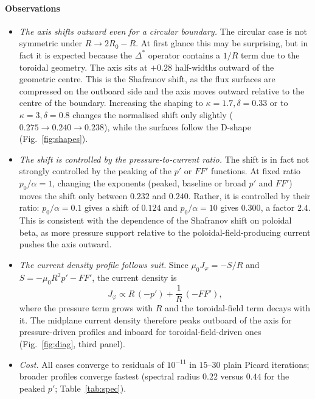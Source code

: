 \documentclass[11pt,a4paper]{article}
\begin{document}
\paragraph{Observations}
\begin{itemize}[nosep]
\item \emph{The axis shifts outward even for a circular boundary.} The circular case is not symmetric under $R\to2R_0-R$. At first glance this may be surprising, but in fact it is expected because the $\Delta^*$ operator contains a $1/R$ term due to the toroidal geometry. The axis sits at $+0.28$ half-widths outward of the geometric centre. This is the Shafranov shift, as the flux surfaces are compressed on the outboard side and the axis moves outward relative to the centre of the boundary. Increasing the shaping to $\kappa=1.7,\delta=0.33$ or to $\kappa=3,\delta=0.8$ changes the normalised shift only slightly ($0.275\to0.240\to0.238$), while the surfaces follow the D-shape (Fig.~\ref{fig:shapes}).
\item \emph{The shift is controlled by the pressure-to-current ratio.} The shift is in fact not strongly controlled by the peaking of the $p'$ or $FF'$ functions. At fixed ratio $p_0/\alpha=1$, changing the exponents (peaked, baseline or broad $p'$ and $FF'$) moves the shift only between $0.232$ and $0.240$. Rather, it is controlled by their ratio: $p_0/\alpha=0.1$ gives a shift of $0.124$ and $p_0/\alpha=10$ gives $0.300$, a factor $2.4$. This is consistent with the dependence of the Shafranov shift on poloidal beta, as more pressure support relative to the poloidal-field-producing current pushes the axis outward.
\item \emph{The current density profile follows suit.} Since $\mu_0J_\varphi=-S/R$ and $S=-\mu_0R^2p'-FF'$, the current density is
\begin{equation*}
J_\varphi\propto R\,(-p')+\frac{1}{R}\,(-FF'),
\end{equation*}
where the pressure term grows with $R$ and the toroidal-field term decays with it. The midplane current density therefore peaks outboard of the axis for pressure-driven profiles and inboard for toroidal-field-driven ones (Fig.~\ref{fig:diag}, third panel).
\item \emph{Cost.} All cases converge to residuals of $10^{-11}$ in $15$--$30$ plain Picard iterations; broader profiles converge fastest (spectral radius $0.22$ versus $0.44$ for the peaked $p'$; Table~\ref{tab:spec}).
\end{itemize}
\end{document}
